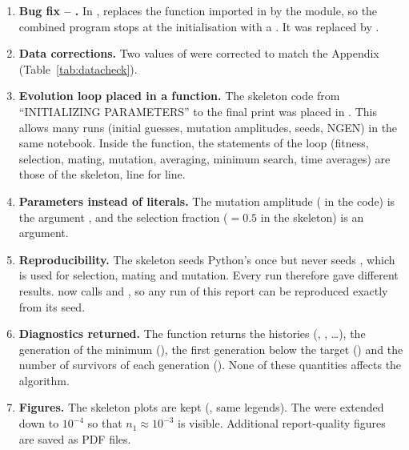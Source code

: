 \begin{enumerate}[label=\textbf{S\arabic*.}]
  \item \textbf{Bug fix -- .} In ,  replaces the
        function  imported in  by the module, so the combined program
        stops at the initialisation with a . It was replaced by
        .
  \item \textbf{Data corrections.} Two values of  were corrected to match the Appendix
        (Table~\ref{tab:datacheck}).
  \item \textbf{Evolution loop placed in a function.} The skeleton code from ``INITIALIZING PARAMETERS'' to
        the final print was placed in .
        This allows many runs (initial guesses, mutation amplitudes, seeds, NGEN) in the same notebook.
        Inside the function, the statements of the loop (fitness, selection, mating, mutation, averaging,
        minimum search, time averages) are those of the skeleton, line for line.
  \item \textbf{Parameters instead of literals.} The mutation amplitude ( in the code) is the
        argument , and the selection fraction  ($=0.5$ in the skeleton) is an argument.
  \item \textbf{Reproducibility.} The skeleton seeds Python's  once but never seeds
        , which is used for selection, mating and mutation. Every run therefore gave
        different results.  now calls  and ,
        so any run of this report can be reproduced exactly from its seed.
  \item \textbf{Diagnostics returned.} The function returns the histories (,
        , \dots), the generation of the minimum (), the first generation below the
        target () and the number of survivors of each generation (). None of
        these quantities affects the algorithm.
  \item \textbf{Figures.} The skeleton plots are kept (, same legends). The
         were extended down to $10^{-4}$ so that $n_1\approx10^{-3}$ is visible. Additional
        report-quality figures are saved as PDF files.
\end{enumerate}

